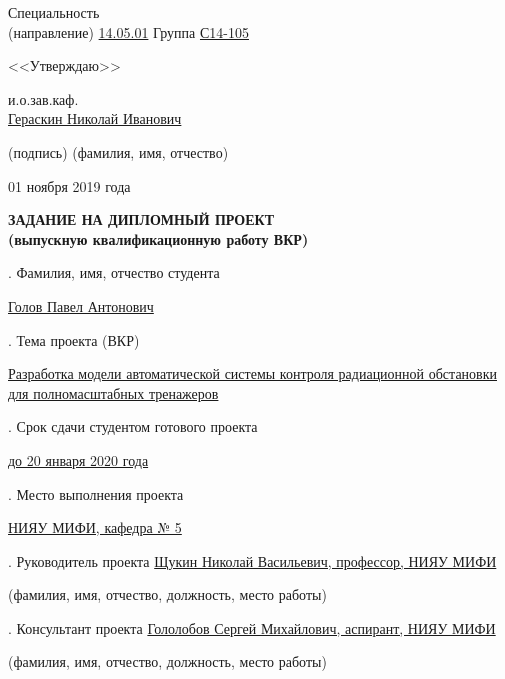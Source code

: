 \clearpage

\normalsize
\noindent
Специальность\\ (направление) \underline{14.05.01} \hspace{4.0cm} Группа \underline{С14-105}

\hspace{9.8cm}<<Утверждаю>>

\hspace{10cm} и.о.зав.каф.\\[0.1cm]

\hspace{7cm} \uline{\hspace{2.0cm}} \hspace{0.01cm} \uline{Гераскин Николай Иванович}

\hspace{7.5cm} \scriptsize (подпись) \hspace{2.0cm} (фамилия, имя, отчество)

\normalsize
\hspace{9cm} 01 ноября 2019 года\\[0.6cm]

\Large
\begin{center}
\textbf{ЗАДАНИЕ НА ДИПЛОМНЫЙ ПРОЕКТ\\
\normalsize
(выпускную квалификационную работу ВКР)} 
\end{center}

\normalsize
{}. Фамилия, имя, отчество студента

\noindent
\uline{Голов Павел Антонович}

. Тема проекта (ВКР)

\noindent
\uline{Разработка модели автоматической системы контроля радиационной обстановки для полномасштабных тренажеров}

. Срок сдачи студентом готового проекта

\noindent
\uline{до 20 января 2020 года}

. Место выполнения проекта

\noindent
\uline{НИЯУ МИФИ, кафедра № 5}

. Руководитель проекта \uline{Щукин Николай Васильевич, профессор, НИЯУ МИФИ}

\scriptsize \hspace{7cm} (фамилия, имя, отчество, должность, место работы)

\normalsize
{}. Консультант проекта \uline{Гололобов Сергей Михайлович, аспирант, НИЯУ МИФИ}

\scriptsize \hspace{7cm} (фамилия, имя, отчество, должность, место работы)

\clearpage


\normalsize
\clearpage